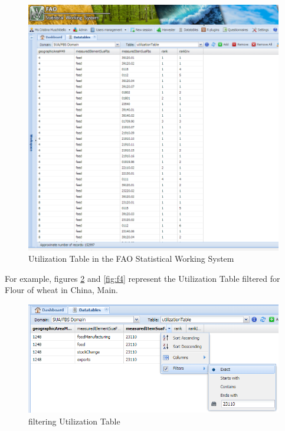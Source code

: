 \documentclass[]{article}
\begin{document}
\begin{figure}[H]

{\centering \includegraphics[width=0.9\linewidth]{images/UtilizationTable/02_UTilizationTable} 

}

\caption{\label{fig:f2}Utilization Table in the FAO Statistical Working System}\label{fig:f2}
\end{figure}

For example, figures \ref{fig:f3} and \ref{fig:f4} represent the
Utilization Table filtered for Flour of wheat in China, Main.

\begin{figure}[H]

{\centering \includegraphics[width=0.9\linewidth]{images/UtilizationTable/03_filter1} 

}

\caption{\label{fig:f3}filtering Utilization Table}\label{fig:f3}
\end{figure}
\end{document}
